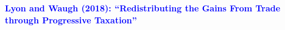 \documentclass[9pt,pdftex]{beamer}
\theoremstyle{definition}
\begin{document}
%
%
%


\begin{frame}
\vspace{1cm}
\begin{center}
\textbf{\textcolor{blue}{\large Lyon and Waugh (2018): ``Redistributing the Gains From Trade through Progressive Taxation''}}
\end{center}
\end{frame}
\end{document}
